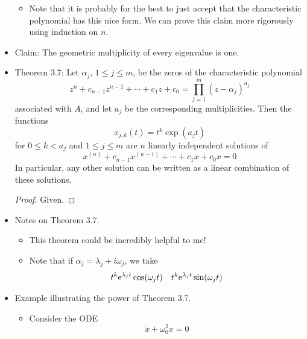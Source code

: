 \documentclass[../notes.tex]{subfiles}
\begin{document}
\begin{itemize}
    \begin{itemize}
        \item Note that it is probably for the best to just accept that the characteristic polynomial has this nice form. We can prove this claim more rigorously using induction on $n$.
    \end{itemize}
    \item Claim: The geometric multiplicity of every eigenvalue is one.
    \item Theorem 3.7: Let $\alpha_j$, $1\leq j\leq m$, be the zeros of the characteristic polynomial
    \begin{equation*}
        z^n+c_{n-1}z^{n-1}+\cdots+c_1z+c_0 = \prod_{j=1}^m(z-\alpha_j)^{a_j}
    \end{equation*}
    associated with $A$, and let $a_j$ be the corresponding multiplicities. Then the functions
    \begin{equation*}
        x_{j,k}(t) = t^k\exp(a_jt)
    \end{equation*}
    for $0\leq k<a_j$ and $1\leq j\leq m$ are $n$ linearly independent solutions of
    \begin{equation*}
        x^{(n)}+c_{n-1}x^{(n-1)}+\cdots+c_1\dot{x}+c_0x = 0
    \end{equation*}
    In particular, any other solution can be written as a linear combination of these solutions.
    \begin{proof}
        Given.
    \end{proof}
    \item Notes on Theorem 3.7.
    \begin{itemize}
        \item This theorem could be incredibly helpful to me!
        \item Note that if $\alpha_j=\lambda_j+i\omega_j$, we take
        \begin{align*}
            t^k\e[\lambda_jt]\cos(\omega_jt)&&
            t^k\e[\lambda_jt]\sin(\omega_jt)
        \end{align*}
    \end{itemize}
    \item Example illustrating the power of Theorem 3.7.
    \begin{itemize}
        \item Consider the ODE
        \begin{equation*}
            \ddot{x}+\omega_0^2x = 0

\end{equation*}
\end{itemize}
\end{itemize}
\end{document}
